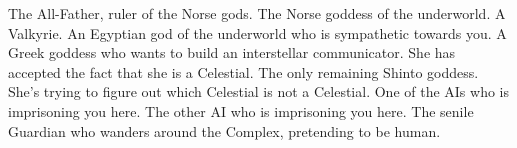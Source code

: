 \documentclass[char]{guardians}
\begin{document}
\begin{contacts}
  \contact{\cOdin{}} The All-Father, ruler of the Norse gods.
  \contact{\cHel{}} The Norse goddess of the underworld.
  \contact{\cVal{}} A Valkyrie.
  \contact{\cAnubis{}} An Egyptian god of the underworld who is sympathetic towards you.
  \contact{\cAthena{}} A Greek goddess who wants to build an interstellar communicator. She has accepted the fact that she is a Celestial.
  \contact{\cAmaterasu{}} The only remaining Shinto goddess. She's trying to figure out which Celestial is not a Celestial.
   One of the AIs who is imprisoning you here.
   The other AI who is imprisoning you here.
  \contact{\cJascha{}} The senile Guardian who wanders around the Complex, pretending to be human.
\end{contacts}
\end{document}
